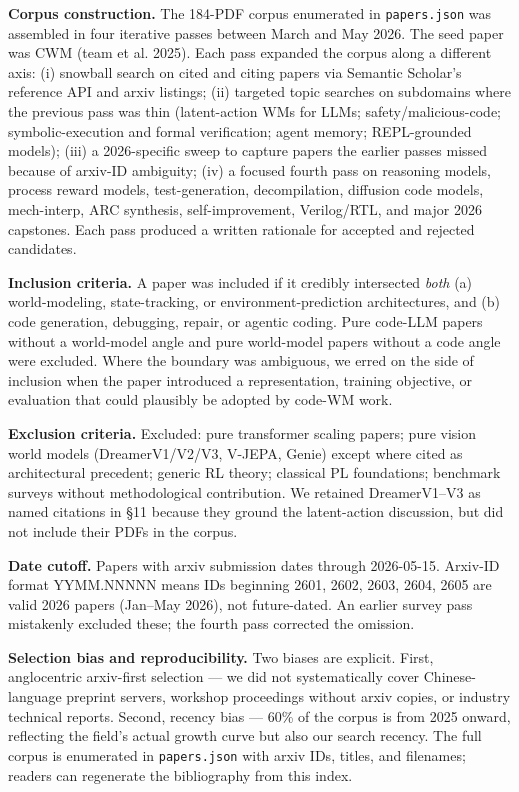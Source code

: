 \documentclass{article}
\begin{document}
\textbf{Corpus construction.} The 184-PDF corpus enumerated in
\texttt{papers.json} was assembled in four iterative passes between
March and May 2026. The seed paper was CWM (team et al. 2025). Each pass
expanded the corpus along a different axis: (i) snowball search on cited
and citing papers via Semantic Scholar's reference API and arxiv
listings; (ii) targeted topic searches on subdomains where the previous
pass was thin (latent-action WMs for LLMs; safety/malicious-code;
symbolic-execution and formal verification; agent memory; REPL-grounded
models); (iii) a 2026-specific sweep to capture papers the earlier
passes missed because of arxiv-ID ambiguity; (iv) a focused fourth pass
on reasoning models, process reward models, test-generation,
decompilation, diffusion code models, mech-interp, ARC synthesis,
self-improvement, Verilog/RTL, and major 2026 capstones. Each pass
produced a written rationale for accepted and rejected candidates.

\textbf{Inclusion criteria.} A paper was included if it credibly
intersected \emph{both} (a) world-modeling, state-tracking, or
environment-prediction architectures, and (b) code generation,
debugging, repair, or agentic coding. Pure code-LLM papers without a
world-model angle and pure world-model papers without a code angle were
excluded. Where the boundary was ambiguous, we erred on the side of
inclusion when the paper introduced a representation, training
objective, or evaluation that could plausibly be adopted by code-WM
work.

\textbf{Exclusion criteria.} Excluded: pure transformer scaling papers;
pure vision world models (DreamerV1/V2/V3, V-JEPA, Genie) except where
cited as architectural precedent; generic RL theory; classical PL
foundations; benchmark surveys without methodological contribution. We
retained DreamerV1--V3 as named citations in §11 because they ground the
latent-action discussion, but did not include their PDFs in the corpus.

\textbf{Date cutoff.} Papers with arxiv submission dates through
2026-05-15. Arxiv-ID format YYMM.NNNNN means IDs beginning 2601, 2602,
2603, 2604, 2605 are valid 2026 papers (Jan--May 2026), not
future-dated. An earlier survey pass mistakenly excluded these; the
fourth pass corrected the omission.

\textbf{Selection bias and reproducibility.} Two biases are explicit.
First, anglocentric arxiv-first selection --- we did not systematically
cover Chinese-language preprint servers, workshop proceedings without
arxiv copies, or industry technical reports. Second, recency bias ---
60\% of the corpus is from 2025 onward, reflecting the field's actual
growth curve but also our search recency. The full corpus is enumerated
in \texttt{papers.json} with arxiv IDs, titles, and filenames; readers
can regenerate the bibliography from this index.
\end{document}
